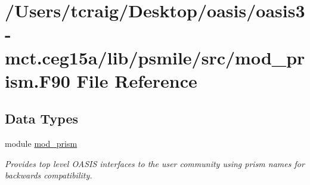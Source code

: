 \hypertarget{mod__prism_8_f90}{\section{/\+Users/tcraig/\+Desktop/oasis/oasis3-\/mct.ceg15a/lib/psmile/src/mod\+\_\+prism.F90 File Reference}
\label{mod__prism_8_f90}
}
\subsection*{Data Types}
\begin{DoxyCompactItemize}
\item 
module \hyperlink{classmod__prism}{mod\+\_\+prism}
\begin{DoxyCompactList}\small\item\em Provides top level O\+A\+S\+I\+S interfaces to the user community using prism names for backwards compatibility. \end{DoxyCompactList}\end{DoxyCompactItemize}
